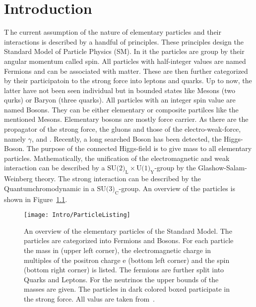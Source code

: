 \chapter{Introduction \label{sec:Intro}}

\lettrine[lines=2]{T}{\,}he current assumption of the nature of elementary particles and their interactions is described by a handful of principles. These principles design the Standard Model of Particle Physics (SM). In it the particles are group by their angular momentum called spin. All particles with half-integer values are named Fermions and can be associated with matter. These are then further categorized by their participatoin to the strong force into leptons and quarks. Up to now, the latter have not been seen individual but in bounded states like Mesons (two qurks) or Baryon (three quarks). All particles with an integer spin value are named Bosons. They can be either elementary or composite partilces like the mentioned Mesons. Elementary bosons are mostly force carrier. As there are the propagator of the strong force, the gluons and those of the electro-weak-force, namely $\gamma{}$, \Zz{} and \Wpm{}. Recently, a long searched Boson has been detected, the Higgs-Boson. The purpose of the connected Higgs-field is to give mass to all elementary particles. Mathematically, the unification of the electromagnetic and weak interaction can be described by a $\textrm{SU(2)}_{\textrm{L}} \times \textrm{U(1)}_{\textrm{Y}}$-group by the Glashow-Salam-Weinberg theory. The strong interaction can be described by the Quantumchromodynamic in a $\textrm{SU(3)}_{\textrm{C}}$-group. An overview of the particles is shown in Figure~\ref{plot:IntroParticles}.

\begin{figure}[!htb]
  \centering
  \texttt{[image: Intro/ParticleListing]}
  \caption[Overview over the elementary particles]{An overview of the elementary particles of the Standard Model. The particles are categorized into Fermions and Bosons. For each particle the mass in \MeVcc (upper left corner), the electromagnetic charge in multiples of the positron charge e (bottom left corner) and the spin (bottom right corner) is listed. The fermions are further split into Quarks and Leptons. For the neutrinos the upper bounds of the masses are given. The particles in dark colored boxed participate in the strong force. All valus are taken from~. \label{plot:IntroParticles} }
\end{figure}

